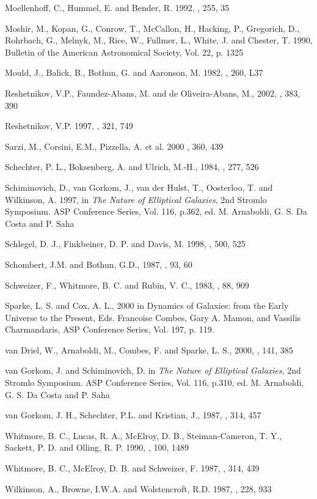 \documentclass{aa}
\begin{document}
\begin{thebibliography}{}
 Moellenhoff, C., Hummel, E. and Bender, R.
1992, \aap, 255, 35

 Moshir, M., Kopan, G., Conrow, T., McCallon, H., 
Hacking, P., Gregorich, D., Rohrbach, G., Melnyk, M., Rice, W., Fullmer, L., White, J. 
and Chester, T. 1990, Bulletin of the American Astronomical Society, Vol. 22, p. 1325 

 Mould, J., Balick, B., Bothun, G. and Aaronson, M.
1982, \apj, 260, L37

  Reshetnikov, V.P., Faundez-Abans, M. and 
de Oliveira-Abans, M., 2002, \aap, 383, 390

 Reshetnikov, V.P. 1997, \aap, 321, 749

 Sarzi, M., Corsini, E.M., Pizzella, A. et al. 2000 \aap,
360, 439

 Schechter, P. L., Boksenberg, A. and
Ulrich, M.-H., 1984, \apj, 277, 526

 Schiminovich, D., van Gorkom, J., van der Hulst, T., 
Oosterloo, T. and Wilkinson, A. 1997, in {\it The Nature of Elliptical Galaxies}, 
2nd Stromlo Symposium. ASP Conference Series, 
Vol. 116, p.362, ed. M. Arnaboldi, G. S. Da Costa and P. Saha 


 Schlegel, D. J., Finkbeiner, D. P. and Davis, M. 1998, 
\apj, 500, 525 

 Schombert, J.M. and Bothun, G.D., 1987, \aj, 93, 60

 Schweizer, F., Whitmore, B. C. and Rubin, V. C., 1983, 
\aj, 88, 909

 Sparke, L. S. and Cox, A. L., 2000 in
Dynamics of Galaxies: from the Early Universe to the Present, 
Eds. Francoise Combes, Gary A. Mamon, and Vassilis Charmandaris, 
ASP Conference Series, Vol. 197, p. 119.

 van Driel, W., Arnaboldi, M.,
 Combes, F. and Sparke, L. S., 2000, \aaps, 141, 385

 van Gorkom, J. and Schiminovich, D.
in {\it The Nature of Elliptical Galaxies}, 2nd Stromlo Symposium. ASP Conference Series, 
Vol. 116, p.310, ed. M. Arnaboldi, G. S. Da Costa and P. Saha 

 van Gorkom, J. H., Schechter, P.L.
and Kristian, J., 1987, \apj, 314, 457

 Whitmore, B. C., Lucas, R. A., McElroy, D. B., Steiman-Cameron, T. Y.,
Sackett, P. D. and Olling, R. P. 1990, \aj, 100, 1489 

 Whitmore, B. C., McElroy, D. B. and Schweizer, F. 1987, 
\apj, 314, 439 

 Wilkinson, A., Browne, I.W.A. and 
Wolstencroft, R.D. 1987, \mnras, 228, 933

\end{thebibliography}
\end{document}

